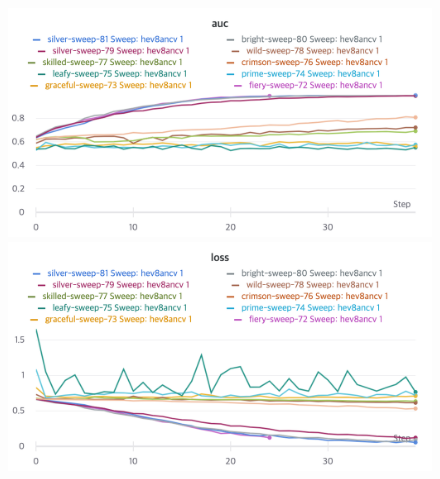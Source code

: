 \documentclass{article}
\begin{document}
\begin{figure}[!htb]
\includegraphics[width=\linewidth]{charts/Section-1-Panel-2-0kro1xk7l}
\caption{}
\endminipage\hfill
{}
\includegraphics[width=\linewidth]{charts/Section-1-Panel-3-nqjz7w5at}
\caption{}
\endminipage
\end{figure}
\end{document}
